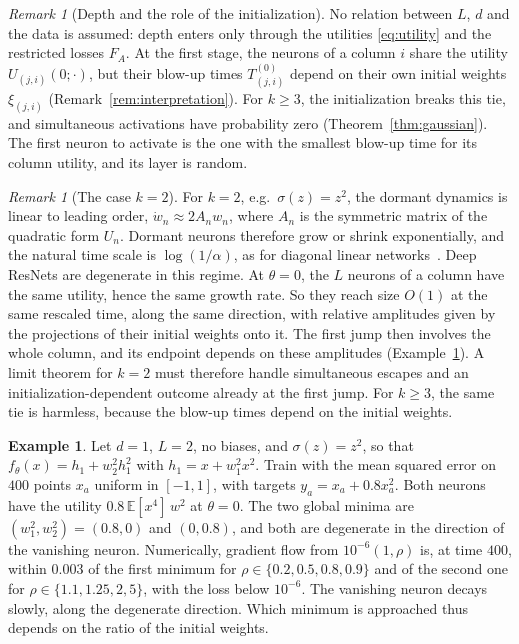 \documentclass[11pt]{article}
\theoremstyle{definition}
\newtheorem{example}[theorem]{Example}
\theoremstyle{remark}
\newtheorem{remark}[theorem]{Remark}
\numberwithin{equation}{section}
\newcommand{\E}{\mathbb{E}}
\begin{document}
\begin{remark}[Depth and the role of the initialization]\label{rem:depth}
No relation between $L$, $d$ and the data is assumed: depth enters only through the utilities \eqref{eq:utility} and the restricted losses $F_A$. At the first stage, the neurons of a column $i$ share the utility $U_{(j,i)}(0;\cdot)$, but their blow-up times $T^{(0)}_{(j,i)}$ depend on their own initial weights $\xi_{(j,i)}$ (Remark~\ref{rem:interpretation}). For $k\ge3$, the initialization breaks this tie, and simultaneous activations have probability zero (Theorem~\ref{thm:gaussian}). The first neuron to activate is the one with the smallest blow-up time for its column utility, and its layer is random.
\end{remark}

\begin{remark}[The case $k=2$]\label{rem:k2}
For $k=2$, e.g.\ $\sigma(z)=z^2$, the dormant dynamics is linear to leading order, $\dot w_n\approx 2A_nw_n$, where $A_n$ is the symmetric matrix of the quadratic form $U_n$. Dormant neurons therefore grow or shrink exponentially, and the natural time scale is $\log(1/\alpha)$, as for diagonal linear networks~\cite{PF23}. Deep ResNets are degenerate in this regime. At $\theta=0$, the $L$ neurons of a column have the same utility, hence the same growth rate. So they reach size $O(1)$ at the same rescaled time, along the same direction, with relative amplitudes given by the projections of their initial weights onto it. The first jump then involves the whole column, and its endpoint depends on these amplitudes (Example~\ref{ex:k2}). A limit theorem for $k=2$ must therefore handle simultaneous escapes and an initialization-dependent outcome already at the first jump. For $k\ge3$, the same tie is harmless, because the blow-up times depend on the initial weights.
\end{remark}

\begin{example}\label{ex:k2}
Let $d=1$, $L=2$, no biases, and $\sigma(z)=z^2$, so that $f_\theta(x)=h_1+w_2^2h_1^2$ with $h_1=x+w_1^2x^2$. Train with the mean squared error on $400$ points $x_a$ uniform in $[-1,1]$, with targets $y_a=x_a+0.8x_a^2$. Both neurons have the utility $0.8\,\E[x^4]\,w^2$ at $\theta=0$. The two global minima are $(w_1^2,w_2^2)=(0.8,0)$ and $(0,0.8)$, and both are degenerate in the direction of the vanishing neuron. Numerically, gradient flow from $10^{-6}(1,\rho)$ is, at time $400$, within $0.003$ of the first minimum for $\rho\in\{0.2,0.5,0.8,0.9\}$ and of the second one for $\rho\in\{1.1,1.25,2,5\}$, with the loss below $10^{-6}$. The vanishing neuron decays slowly, along the degenerate direction. Which minimum is approached thus depends on the ratio of the initial weights.
\end{example}
\end{document}
